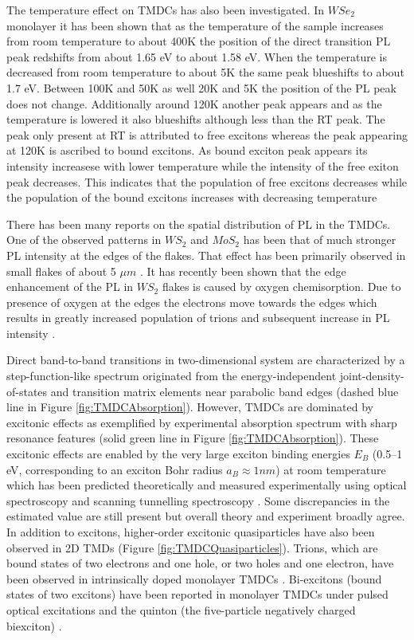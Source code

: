 The temperature effect on TMDCs has also been investigated. In $WSe_2$ monolayer it has been shown that as the temperature of the sample increases from room temperature to about 400K the position of the direct transition PL peak redshifts from about 1.65 eV to about 1.58 eV. When the temperature is decreased from room temperature to about 5K the same peak blueshifts to about 1.7 eV. Between 100K and 50K as well 20K and 5K the position of the PL peak does not change. Additionally around 120K another peak appears and as the temperature is lowered it also blueshifts although less than the RT peak. The peak only present at RT is attributed to free excitons whereas the peak appearing at 120K is ascribed to bound excitons. As bound exciton peak appears its intensity increasese with lower temperature while the intensity of the free exiton peak decreases. This indicates that the population of free excitons decreases while the population of the bound excitons increases with decreasing temperature \cite{PhotoluminescencePropertiesAndExcitonDynamicsInMonolayerWSe2}
	
There has been many reports on the spatial distribution of PL in the TMDCs. One of the observed patterns in $WS_2$ and $MoS_2$ has been that of much stronger PL intensity at the edges of the flakes. That effect has been primarily observed in small flakes of about 5 $\mu m$ \cite{ExtraordinaryRoomTemperaturePhotoluminescenceInTriangularWS2Monolayers}. It has recently been shown that the edge enhancement of the PL in $WS_2$ flakes is caused by oxygen chemisorption. Due to presence of oxygen at the edges the electrons move towards the edges which results in greatly increased population of trions and subsequent increase in PL intensity \cite{Hu2019}.

Direct band-to-band transitions in two-dimensional system are characterized by a step-function-like spectrum originated from the energy-independent joint-density-of-states and transition matrix elements near parabolic band edges \cite{Haug1994} (dashed blue line in Figure \ref{fig:TMDCAbsorption}). However, TMDCs  are dominated by excitonic effects as exemplified by experimental absorption spectrum with sharp resonance features \cite{EmergingPhotoluminescenceInMonolayerMoS2} (solid green line in Figure \ref{fig:TMDCAbsorption}). These excitonic effects are enabled by the very large exciton binding energies $E_B$ (0.5–1 eV, corresponding to an exciton Bohr radius $a_B \approx 1 nm$) at room temperature which has been predicted theoretically and measured experimentally using optical spectroscopy and scanning tunnelling spectroscopy \cite{Wei2017}\cite{Li2015b}. Some discrepancies in the estimated value are still present but overall theory and experiment broadly agree. 
In addition to excitons, higher-order excitonic quasiparticles have also been observed in 2D TMDs (Figure \ref{fig:TMDCQuasiparticles}). Trions, which are bound states of two electrons and one hole, or two holes and one electron, have been observed in intrinsically doped monolayer TMDCs \cite{Mak2012}\cite{Ross2013}. Bi-excitons (bound states of two excitons) have been reported in monolayer TMDCs under pulsed optical excitations \cite{doi:10.1021/nn5059908}\cite{You2015} and the quinton (the five-particle negatively charged biexciton) \cite{Barbone2018}.
 
